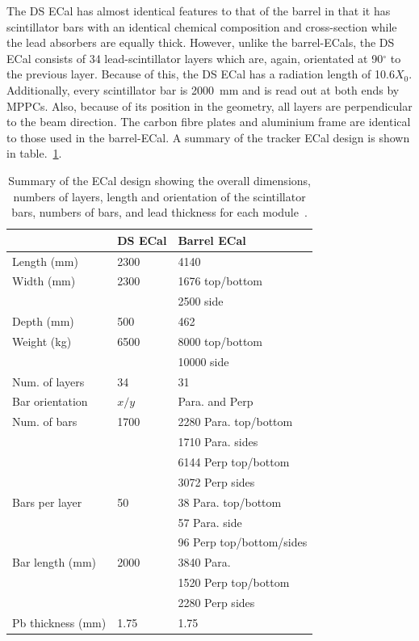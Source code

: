 \newline
\newline
The DS ECal has almost identical features to that of the barrel in that it has scintillator bars with an identical chemical composition and cross-section while the lead absorbers are equally thick.  However, unlike the barrel-ECals, the DS ECal consists of 34 lead-scintillator layers which are, again, orientated at 90$^\circ$ to the previous layer.  Because of this, the DS ECal has a radiation length of 10.6$X_0$.  Additionally, every scintillator bar is 2000~mm and is read out at both ends by MPPCs.  Also, because of its position in the geometry, all layers are perpendicular to the beam direction.  The carbon fibre plates and aluminium frame are identical to those used in the barrel-ECal.
\newline
\newline
A summary of the tracker ECal design is shown in table.~\ref{table:ECalDesign}.
\begin{table}
\begin{center}
\begin{tabular}{l|l|l}
\hline
        & DS ECal  &Barrel ECal  \\ \hline
Length (mm)& 2300      & 4140   \\ 
Width (mm)  & 2300      & 1676  top/bottom \\ 
        &          & 2500 side  \\ 
Depth (mm)  & 500     & 462    \\
Weight (kg) & 6500 & 8000 top/bottom  \\
            &      & 10000 side        \\ \hline
Num. of layers &  34      &  31  \\ \hline
Bar orientation & $x/y$ &Para. and Perp \\ \hline
Num. of bars    & 1700     & 2280 Para. top/bottom  \\ 
        &          & 1710 Para. sides \\     
        &          & 6144 Perp top/bottom   \\ 
        &          & 3072 Perp sides       \\ \hline  
Bars per layer & 50 & 38 Para. top/bottom\\
               &    & 57 Para. side\\
               &    & 96 Perp top/bottom/sides  \\  \hline
Bar length (mm) & 2000  & 3840  Para. \\ 
           &      & 1520 Perp top/bottom \\ 
           &      & 2280 Perp sides      \\ \hline
Pb thickness (mm) & 1.75  & 1.75    \\ \hline 
\end{tabular}
\caption{Summary of the ECal design showing the overall dimensions, numbers of layers, length and orientation of the scintillator bars, numbers of bars, and lead thickness for each module~\cite{1748-0221-8-10-P10019}.}
\label{table:ECalDesign} 
\end{center}
\end{table}
